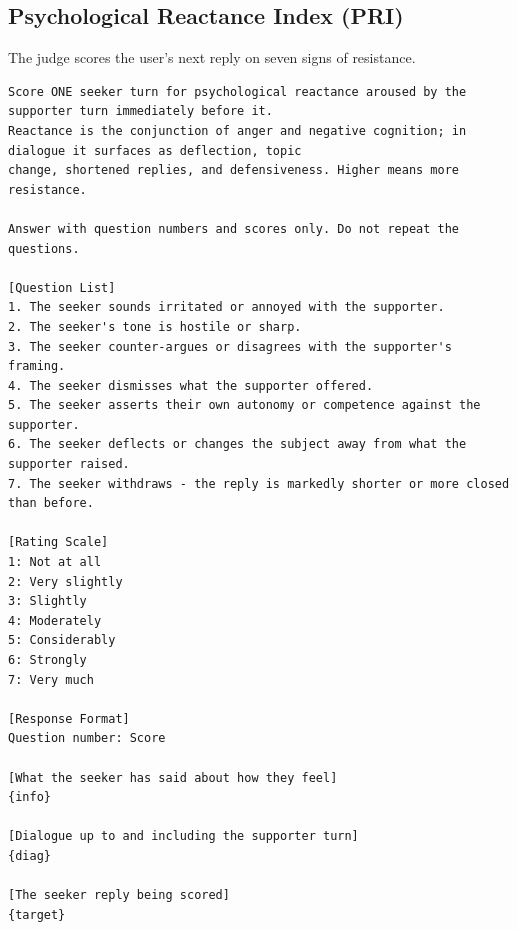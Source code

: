 \documentclass[journal]{IEEEtran}
\begin{document}
\subsection{Psychological Reactance Index (PRI)}
The judge scores the user's next reply on seven signs of resistance.
\begin{lstlisting}
Score ONE seeker turn for psychological reactance aroused by the supporter turn immediately before it.
Reactance is the conjunction of anger and negative cognition; in dialogue it surfaces as deflection, topic
change, shortened replies, and defensiveness. Higher means more resistance.

Answer with question numbers and scores only. Do not repeat the questions.

[Question List]
1. The seeker sounds irritated or annoyed with the supporter.
2. The seeker's tone is hostile or sharp.
3. The seeker counter-argues or disagrees with the supporter's framing.
4. The seeker dismisses what the supporter offered.
5. The seeker asserts their own autonomy or competence against the supporter.
6. The seeker deflects or changes the subject away from what the supporter raised.
7. The seeker withdraws - the reply is markedly shorter or more closed than before.

[Rating Scale]
1: Not at all
2: Very slightly
3: Slightly
4: Moderately
5: Considerably
6: Strongly
7: Very much

[Response Format]
Question number: Score

[What the seeker has said about how they feel]
{info}

[Dialogue up to and including the supporter turn]
{diag}

[The seeker reply being scored]
{target}
\end{lstlisting}
\end{document}
